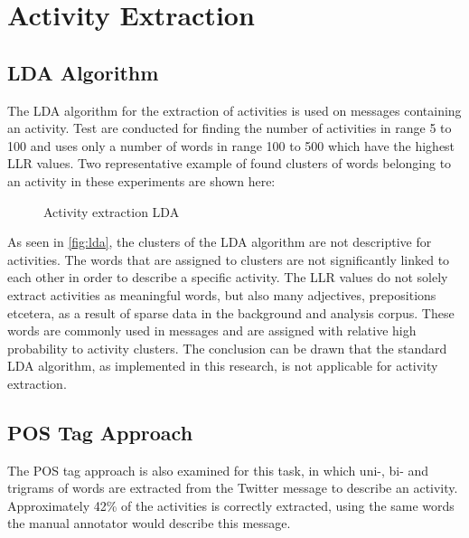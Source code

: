 
\section{Activity Extraction}\label{sec:res_extraction}

\subsection{LDA Algorithm}
The LDA algorithm for the extraction of activities is used on messages containing an activity. Test are conducted for finding the number of activities in range 5 to 100 and uses only a number of words in range 100 to 500 which have the highest LLR values. Two representative example of found clusters of words belonging to an activity in these experiments are shown here:
~\\
\begin{figure}[H]
  \centering

\begin{framed}
  \theverbbox
\end{framed}

  \caption{Activity extraction LDA}\label{fig:lda}
\end{figure}

As seen in \autoref{fig:lda}, the clusters of the LDA algorithm are not descriptive for activities. The words that are assigned to clusters are not significantly linked to each other in order to describe a specific activity. The LLR values do not solely extract activities as meaningful words, but also many adjectives, prepositions etcetera, as a result of sparse data in the background and analysis corpus. These words are commonly used in messages and are assigned with relative high probability to activity clusters. The conclusion can be drawn that the standard LDA algorithm, as implemented in this research, is not applicable for activity extraction.

\subsection{POS Tag Approach}
The POS tag approach is also examined for this task, in which uni-, bi- and trigrams of words are extracted from the Twitter message to describe an activity. Approximately 42\% of the activities is correctly extracted, using the same words the manual annotator would describe this message. 

